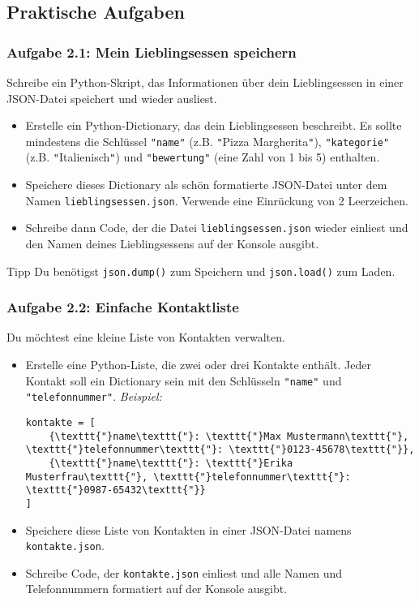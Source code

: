 \documentclass[11pt, a4paper]{article}
\begin{document}
\subsection*{Praktische Aufgaben \faLaptopCode}

\subsubsection*{Aufgabe 2.1: Mein Lieblingsessen speichern}
Schreibe ein Python-Skript, das Informationen über dein Lieblingsessen in einer JSON-Datei speichert und wieder ausliest.

\begin{itemize}
    \item Erstelle ein Python-Dictionary, das dein Lieblingsessen beschreibt. Es sollte mindestens die Schlüssel \texttt{\texttt{"}name\texttt{"}} (z.B. \texttt{"}Pizza Margherita\texttt{"}), \texttt{\texttt{"}kategorie\texttt{"}} (z.B. \texttt{"}Italienisch\texttt{"}) und \texttt{\texttt{"}bewertung\texttt{"}} (eine Zahl von 1 bis 5) enthalten.
    \item Speichere dieses Dictionary als schön formatierte JSON-Datei unter dem Namen \texttt{lieblingsessen.json}. Verwende eine Einrückung von 2 Leerzeichen.
    \item Schreibe dann Code, der die Datei \texttt{lieblingsessen.json} wieder einliest und den Namen deines Lieblingsessens auf der Konsole ausgibt.
\end{itemize}
\begin{infoblock}{Tipp}
Du benötigst \texttt{json.dump()} zum Speichern und \texttt{json.load()} zum Laden.
\end{infoblock}

\subsubsection*{Aufgabe 2.2: Einfache Kontaktliste}
Du möchtest eine kleine Liste von Kontakten verwalten.

\begin{itemize}
    \item Erstelle eine Python-Liste, die zwei oder drei Kontakte enthält. Jeder Kontakt soll ein Dictionary sein mit den Schlüsseln \texttt{\texttt{"}name\texttt{"}} und \texttt{\texttt{"}telefonnummer\texttt{"}}.
        \textit{Beispiel:}
\begin{lstlisting}
kontakte = [
    {\texttt{"}name\texttt{"}: \texttt{"}Max Mustermann\texttt{"}, \texttt{"}telefonnummer\texttt{"}: \texttt{"}0123-45678\texttt{"}},
    {\texttt{"}name\texttt{"}: \texttt{"}Erika Musterfrau\texttt{"}, \texttt{"}telefonnummer\texttt{"}: \texttt{"}0987-65432\texttt{"}}
]
\end{lstlisting}
    \item Speichere diese Liste von Kontakten in einer JSON-Datei namens \texttt{kontakte.json}.
    \item Schreibe Code, der \texttt{kontakte.json} einliest und alle Namen und Telefonnummern formatiert auf der Konsole ausgibt.
\end{itemize}
\end{document}
